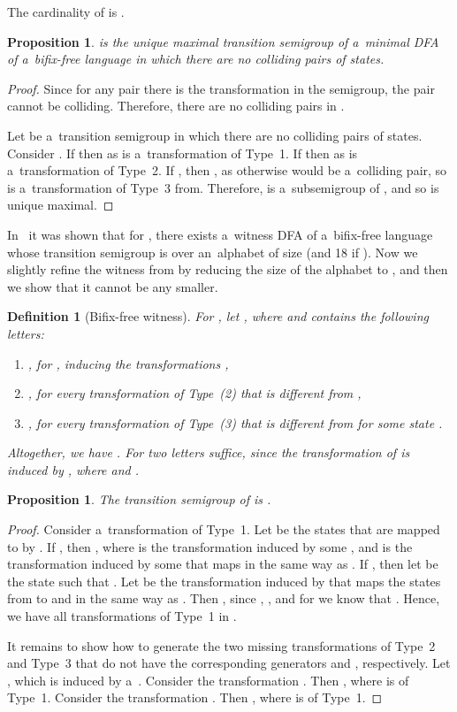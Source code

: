\documentclass{amsart}
\newtheorem{proposition}[theorem]{Proposition}
\newtheorem{definition}[theorem]{Definition}
\begin{document}
The cardinality of  is .

\begin{proposition}\label{pro:Wbf_unique}
 is the unique maximal transition semigroup of a~minimal DFA  of a~bifix-free language in which there are no colliding pairs of states.
\end{proposition}
\begin{proof}
Since for any pair  there is the transformation  in the semigroup, the pair  cannot be colliding.
Therefore, there are no colliding pairs in .

Let  be a~transition semigroup in which there are no colliding pairs of states.
Consider .
If  then  as is a~transformation of Type~1.
If  then  as is a~transformation of Type~2.
If , then , as otherwise  would be a~colliding pair, so  is a~transformation of Type~3 from.
Therefore,  is a~subsemigroup of , and so  is unique maximal.
\end{proof}

In~\cite{BLY12} it was shown that for , there exists a~witness DFA of a~bifix-free language whose transition semigroup is  over an~alphabet of size  (and 18 if ).
Now we slightly refine the witness from \cite[Proposition~31]{BLY12} by reducing the size of the alphabet to , and then we show that it cannot be any smaller.
\begin{definition}[Bifix-free witness]
For , let , where  and  contains the following letters:
\begin{enumerate}
\item , for , inducing the transformations ,
\item , for every transformation of Type~(2) that is different from ,
\item , for every transformation of Type~(3) that is different from  for some state .
\end{enumerate}
Altogether, we have .
For  two letters suffice, since the transformation of  is induced by , where  and .
\end{definition}

\begin{proposition}
The transition semigroup of  is .
\end{proposition}
\begin{proof}
Consider a~transformation  of Type~1.
Let  be the states that are mapped to  by .
If , then , where  is the transformation induced by some , and  is the transformation induced by some  that maps  in the same way as .
If , then let  be the state such that .
Let  be the transformation induced by  that maps the states from  to  and  in the same way as .
Then , since , , and for  we know that .
Hence, we have all transformations of Type~1 in .

It remains to show how to generate the two missing transformations of Type~2 and Type~3 that do not have the corresponding generators  and , respectively.
Let , which is induced by a~.
Consider the transformation .
Then , where  is of Type~1.
Consider the transformation .
Then , where  is of Type~1.
\end{proof}
\end{document}
